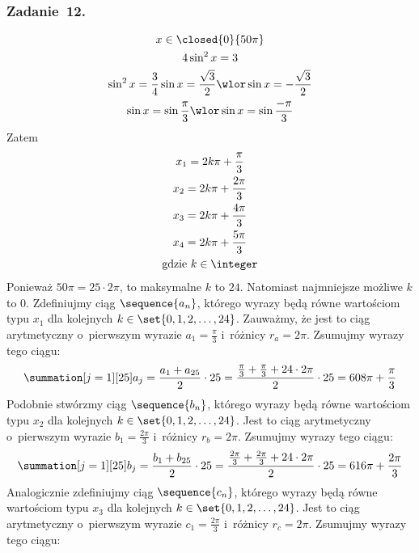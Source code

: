 \subsubsection*{Zadanie~12.}
\begin{gather*}
    x \in \closed{0}{50\pi}\\
    4\sin^2x = 3\\
    \sin^2x = \frac{3}{4}
    \sin x = \frac{\sqrt{3}}{2} \wlor \sin x = -\frac{\sqrt{3}}{2}\\
    \sin x = \sin\frac{\pi}{3} \wlor \sin x = \sin\frac{-\pi}{3}
\end{gather*}
Zatem
\begin{gather*}
    x_1 = 2k\pi + \frac{\pi}{3}\\
    x_2 = 2k\pi + \frac{2\pi}{3}\\
    x_3 = 2k\pi + \frac{4\pi}{3}\\
    x_4 = 2k\pi + \frac{5\pi}{3}\\
    \text{gdzie \(k \in \integer\)}
\end{gather*}
Ponieważ \(50\pi = 25 \cdot 2\pi\), to maksymalne \(k\) to \(24\). Natomiast najmniejsze możliwe \(k\) to \(0\). Zdefiniujmy ciąg \(\sequence{a_n}\), którego wyrazy będą równe wartościom typu \(x_1\) dla kolejnych \(k \in \set{0, 1, 2, \ldots, 24}\). Zauważmy, że jest to ciąg arytmetyczny o~pierwszym wyrazie \(a_1 = \frac{\pi}{3}\) i~różnicy \(r_a = 2\pi\). Zsumujmy wyrazy tego ciągu:
\begin{equation*}
    \summation[j = 1][25] a_j
        = \frac{a_1 + a_{25}}{2} \cdot 25
        = \frac{\frac{\pi}{3} + \frac{\pi}{3} + 24 \cdot 2\pi}{2} \cdot 25
        = 608\pi + \frac{\pi}{3}
\end{equation*}
Podobnie stwórzmy ciąg \(\sequence{b_n}\), którego wyrazy będą równe wartościom typu \(x_2\) dla kolejnych \(k \in \set{0, 1, 2, \ldots, 24}\). Jest to ciąg arytmetyczny o~pierwszym wyrazie \(b_1 = \frac{2\pi}{3}\) i~różnicy \(r_b = 2\pi\). Zsumujmy wyrazy tego ciągu:
\begin{equation*}
    \summation[j = 1][25] b_j
        = \frac{b_1 + b_{25}}{2} \cdot 25
        = \frac{\frac{2\pi}{3} + \frac{2\pi}{3} + 24 \cdot 2\pi}{2} \cdot 25
        = 616\pi + \frac{2\pi}{3}
\end{equation*}
Analogicznie zdefiniujmy ciąg \(\sequence{c_n}\), którego wyrazy będą równe wartościom typu \(x_3\) dla kolejnych \(k \in \set{0, 1, 2, \ldots, 24}\). Jest to ciąg arytmetyczny o~pierwszym wyrazie \(c_1 = \frac{2\pi}{3}\) i~różnicy \(r_c = 2\pi\). Zsumujmy wyrazy tego ciągu:
